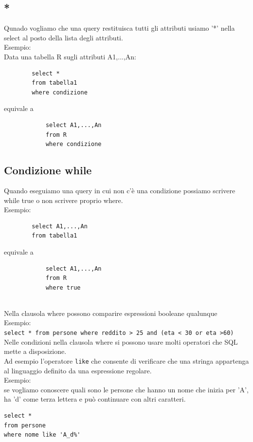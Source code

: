 \subsection{*}
Qunado vogliamo che una query restituisca tutti gli attributi usiamo '*' nella select al posto della lista degli attributi.\\
\textcolor{verdeEsempio}{Esempio:}\\
Data una tabella R sugli attributi A1,...,An:\medskip\\
\begin{minipage}[c]{0.40\textwidth}
       \begin{verbatim}
        select *
        from tabella1
        where condizione
        \end{verbatim}
    \end{minipage}
    equivale a
    \begin{minipage}[c]{0.25\textwidth}
        \begin{verbatim}
            select A1,...,An
            from R
            where condizione
        \end{verbatim}
\end{minipage}
\subsection{Condizione while}
Quando eseguiamo una query in cui non c'è una condizione possiamo scrivere while true o non scrivere proprio where.\\
\textcolor{verdeEsempio}{Esempio:}\\
\begin{minipage}[c]{0.40\textwidth}
       \begin{verbatim}
        select A1,...,An
        from tabella1
        \end{verbatim}
    \end{minipage}
    equivale a
    \begin{minipage}[c]{0.25\textwidth}
        \begin{verbatim}
            select A1,...,An
            from R
            where true
        \end{verbatim}
\end{minipage}\medskip\\
Nella clausola where possono comparire espressioni booleane qualunque\\
\textcolor{verdeEsempio}{Esempio:}\\
\texttt{select *
from persone
where reddito > 25 and (eta < 30 or eta >60)}\\
Nelle condizioni nella clausola where si possono usare molti operatori che SQL mette a disposizione.\\
Ad esempio l'operatore \texttt{like} che consente di verificare che una stringa appartenga al linguaggio definito da una espressione regolare.\\
\textcolor{verdeEsempio}{Esempio:}\\
se vogliamo conoscere quali sono le persone che hanno un nome che inizia per 'A', ha 'd' come terza lettera e può continuare con altri caratteri.
\begin{verbatim}
select *
from persone
where nome like 'A_d%'
\end{verbatim}
